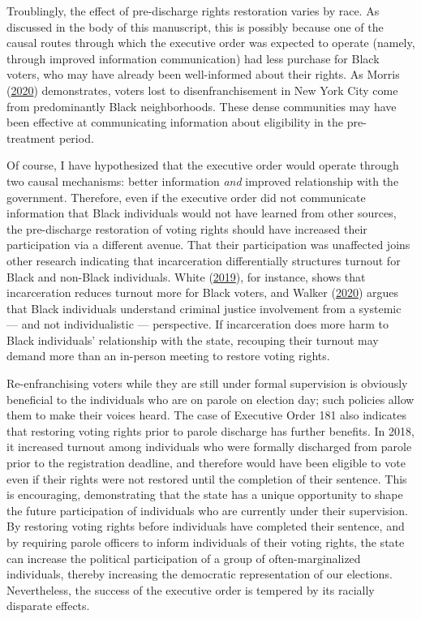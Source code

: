 \documentclass[
  12pt,
]{article}
\begin{document}
Troublingly, the effect of pre-discharge rights restoration varies by race. As discussed in the body of this manuscript, this is possibly because one of the causal routes through which the executive order was expected to operate (namely, through improved information communication) had less purchase for Black voters, who may have already been well-informed about their rights. As Morris (\protect\hyperlink{ref-Morris2020}{2020}) demonstrates, voters lost to disenfranchisement in New York City come from predominantly Black neighborhoods. These dense communities may have been effective at communicating information about eligibility in the pre-treatment period.

Of course, I have hypothesized that the executive order would operate through two causal mechanisms: better information \emph{and} improved relationship with the government. Therefore, even if the executive order did not communicate information that Black individuals would not have learned from other sources, the pre-discharge restoration of voting rights should have increased their participation via a different avenue. That their participation was unaffected joins other research indicating that incarceration differentially structures turnout for Black and non-Black individuals. White (\protect\hyperlink{ref-White2019}{2019}), for instance, shows that incarceration reduces turnout more for Black voters, and Walker (\protect\hyperlink{ref-Walker2020a}{2020}) argues that Black individuals understand criminal justice involvement from a systemic --- and not individualistic --- perspective. If incarceration does more harm to Black individuals' relationship with the state, recouping their turnout may demand more than an in-person meeting to restore voting rights.

Re-enfranchising voters while they are still under formal supervision is obviously beneficial to the individuals who are on parole on election day; such policies allow them to make their voices heard. The case of Executive Order 181 also indicates that restoring voting rights prior to parole discharge has further benefits. In 2018, it increased turnout among individuals who were formally discharged from parole prior to the registration deadline, and therefore would have been eligible to vote even if their rights were not restored until the completion of their sentence. This is encouraging, demonstrating that the state has a unique opportunity to shape the future participation of individuals who are currently under their supervision. By restoring voting rights before individuals have completed their sentence, and by requiring parole officers to inform individuals of their voting rights, the state can increase the political participation of a group of often-marginalized individuals, thereby increasing the democratic representation of our elections. Nevertheless, the success of the executive order is tempered by its racially disparate effects.
\end{document}
